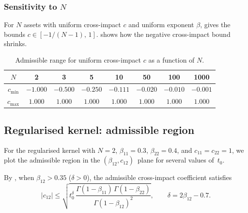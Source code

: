 \documentclass[12pt]{article}
\theoremstyle{definition}
\theoremstyle{remark}
\begin{document}
\subsubsection{Sensitivity to $N$}

For $N$ assets with uniform cross-impact $c$ and uniform exponent $\beta$,
 gives the bounds $c\in[-1/(N-1),\,1]$.
 shows how the negative cross-impact bound shrinks.

\begin{table}[ht]
\centering
\caption{Admissible range for uniform cross-impact $c$ as a function of $N$.}
\label{tab:sensitivity_N}
\begin{tabular}{c|ccccccc}
\toprule
$N$ & 2 & 3 & 5 & 10 & 50 & 100 & 1000 \\
\midrule
$c_{\min}$ & $-1.000$ & $-0.500$ & $-0.250$ & $-0.111$ & $-0.020$ & $-0.010$ & $-0.001$ \\
$c_{\max}$ & $1.000$ & $1.000$ & $1.000$ & $1.000$ & $1.000$ & $1.000$ & $1.000$ \\
\bottomrule
\end{tabular}
\end{table}


\subsection{Regularised kernel: admissible region}\label{sec:num_reg}

For the regularised kernel with $N=2$, $\beta_{11}=0.3$, $\beta_{22}=0.4$,
and $c_{11}=c_{22}=1$, we plot the admissible region in the
$(\beta_{12},c_{12})$~plane for several values of~$t_0$.

By , when $\beta_{12} > 0.35$ ($\delta > 0$),
the admissible cross-impact coefficient satisfies
\[
  |c_{12}| \le \sqrt{t_0^{\delta}\,
    \frac{\Gamma(1-\beta_{11})\,\Gamma(1-\beta_{22})}{\Gamma(1-\beta_{12})^2}},
  \qquad \delta = 2\beta_{12} - 0.7.
\]
\end{document}
